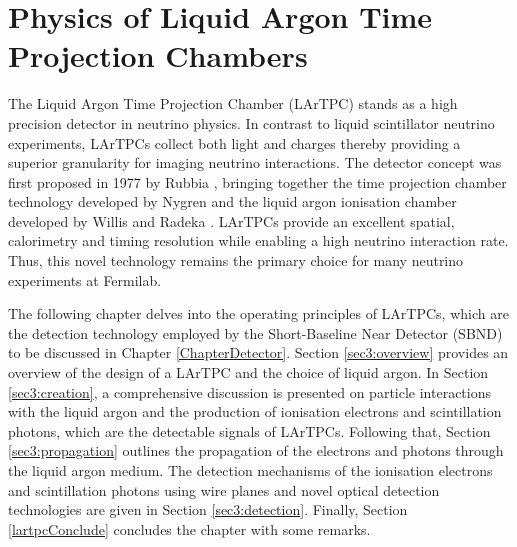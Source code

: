 \chapter{Physics of Liquid Argon Time Projection Chambers}
\label{Chapter3}
\ifpdf
    \graphicspath{{Chapter3/Figs/Raster/}{Chapter3/Figs/PDF/}{Chapter3/Figs/}}
\else
    \graphicspath{{Chapter3/Figs/Vector/}{Chapter3/Figs/}}
\fi


The Liquid Argon Time Projection Chamber (LArTPC) stands as a high precision detector in neutrino physics.
In contrast to liquid scintillator neutrino experiments, LArTPCs collect both light and charges thereby providing a superior granularity for imaging neutrino interactions.
The detector concept was first proposed in 1977 by Rubbia \cite{Rubbia}, bringing together the time projection chamber technology developed by Nygren \cite{Nygren1, Nygren2} and the liquid argon ionisation chamber developed by Willis and Radeka \cite{WillisRadeka}.
LArTPCs provide an excellent spatial, calorimetry and timing resolution while enabling a high neutrino interaction rate.
Thus, this novel technology remains the primary choice for many neutrino experiments at Fermilab.

The following chapter delves into the operating principles of LArTPCs, which are the detection technology employed by the Short-Baseline Near Detector (SBND) to be discussed in Chapter \ref{ChapterDetector}.
Section \ref{sec3:overview} provides an overview of the design of a LArTPC and the choice of liquid argon.
In Section \ref{sec3:creation}, a comprehensive discussion is presented on particle interactions with the liquid argon and the production of ionisation electrons and scintillation photons, which are the detectable signals of LArTPCs.
Following that, Section \ref{sec3:propagation} outlines the propagation of the  electrons and photons through the liquid argon medium.
The detection mechanisms of the ionisation electrons and scintillation photons using wire planes and novel optical detection technologies are given in Section \ref{sec3:detection}.
Finally, Section \ref{lartpcConclude} concludes the chapter with some remarks.


